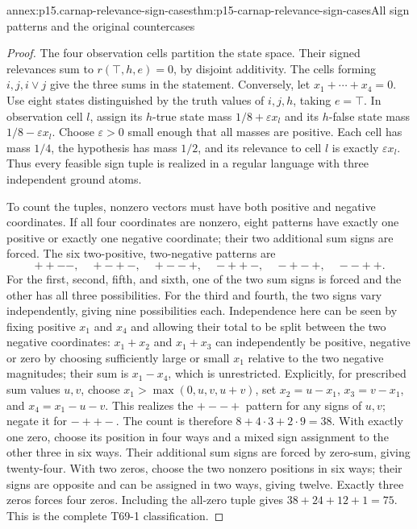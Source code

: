 \begin{annexitem}{annex:p15.carnap-relevance-sign-cases}{thm:p15-carnap-relevance-sign-cases}{All sign patterns and the original countercases}
\begin{proof}
The four observation cells partition the state space. Their signed
relevances sum to \(r(\top,h,e)=0\), by disjoint additivity.
The cells forming \(i,j,i\lor j\) give the three sums in the
statement. Conversely, let \(x_1+\cdots+x_4=0\). Use eight
states distinguished by the truth values of \(i,j,h\), taking
\(e=\top\). In observation cell \(l\), assign its \(h\)-true
state mass \(1/8+\varepsilon x_l\) and its \(h\)-false state
mass \(1/8-\varepsilon x_l\). Choose \(\varepsilon>0\) small
enough that all masses are positive. Each cell has mass \(1/4\),
the hypothesis has mass \(1/2\), and its relevance to cell \(l\)
is exactly \(\varepsilon x_l\). Thus every feasible sign tuple
is realized in a regular language with three independent ground atoms.

To count the tuples, nonzero vectors must have both positive and
negative coordinates. If all four coordinates are nonzero, eight
patterns have exactly one positive or exactly one negative coordinate;
their two additional sum signs are forced. The six two-positive,
two-negative patterns are
\[
 ++--,\quad +-+-,\quad +--+,\quad -++-,\quad -+-+,\quad --++.
\]
For the first, second, fifth, and sixth, one of the two sum signs is
forced and the other has all three possibilities. For the third and
fourth, the two signs vary independently, giving nine possibilities
each. Independence here can be seen by fixing positive \(x_1\)
and \(x_4\) and allowing their total to be split between the two
negative coordinates: \(x_1+x_2\) and \(x_1+x_3\) can independently
be positive, negative or zero by choosing sufficiently large or small
\(x_1\) relative to the two negative magnitudes; their sum is
\(x_1-x_4\), which is unrestricted. Explicitly, for prescribed
sum values \(u,v\), choose
\(x_1>\max(0,u,v,u+v)\), set
\(x_2=u-x_1\), \(x_3=v-x_1\), and
\(x_4=x_1-u-v\). This realizes the \(+--+\) pattern for any
signs of \(u,v\); negate it for \(-++-\).
The count is therefore \(8+4\cdot3+2\cdot9=38\).
With exactly one zero, choose its position in four ways and a mixed
sign assignment to the other three in six ways. Their additional sum
signs are forced by zero-sum, giving twenty-four. With two zeros,
choose the two nonzero positions in six ways; their signs are opposite
and can be assigned in two ways, giving twelve. Exactly three zeros
forces four zeros. Including the all-zero tuple gives
\(38+24+12+1=75\). This is the complete T69-1 classification.


\end{proof}
\end{annexitem}
